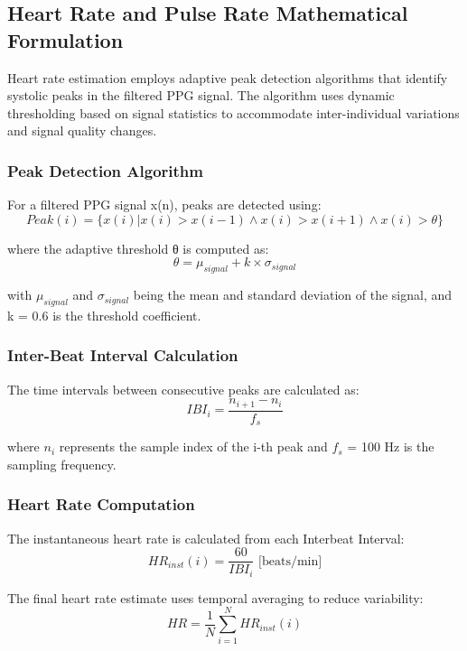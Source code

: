 \documentclass{ieeeaccess}
\begin{document}
\subsection{Heart Rate and Pulse Rate Mathematical Formulation}
Heart rate estimation employs adaptive peak detection algorithms that identify systolic peaks in the filtered PPG signal. The algorithm uses dynamic thresholding based on signal statistics to accommodate inter-individual variations and signal quality changes.

\subsubsection{Peak Detection Algorithm}
For a filtered PPG signal x(n), peaks are detected using:
\begin{equation}
Peak(i) = \{x(i) | x(i) > x(i-1) \wedge x(i) > x(i+1) \wedge x(i) > \theta\}
\end{equation}

where the adaptive threshold θ is computed as:
\begin{equation}
\theta = \mu_{signal} + k \times \sigma_{signal}
\end{equation}

with $\mu_{signal}$ and $\sigma_{signal}$ being the mean and standard deviation of the signal, and k = 0.6 is the threshold coefficient.

\subsubsection{Inter-Beat Interval Calculation}
The time intervals between consecutive peaks are calculated as:
\begin{equation}
IBI_i = \frac{n_{i+1} - n_i}{f_s}
\end{equation}

where $n_i$ represents the sample index of the i-th peak and $f_s$ = 100 Hz is the sampling frequency.

\subsubsection{Heart Rate Computation}
The instantaneous heart rate is calculated from each Interbeat Interval:
\begin{equation}
HR_{inst}(i) = \frac{60}{IBI_i} \text{ [beats/min]}
\end{equation}

The final heart rate estimate uses temporal averaging to reduce variability:
\begin{equation}
HR = \frac{1}{N} \sum_{i=1}^{N} HR_{inst}(i)
\end{equation}
\end{document}
